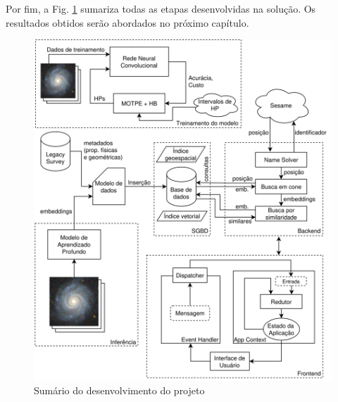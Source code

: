 Por fim, a Fig. \ref{fig:diagrama-completo} sumariza todas as etapas desenvolvidas na solução. Os resultados obtidos serão abordados no próximo capítulo.

\begin{figure}[!ht]
  \centering
  \caption{Sumário do desenvolvimento do projeto}
  \label{fig:diagrama-completo}
  \includegraphics[width=\linewidth]{figures/full_diagram.png}
\end{figure}

\chaptersep


